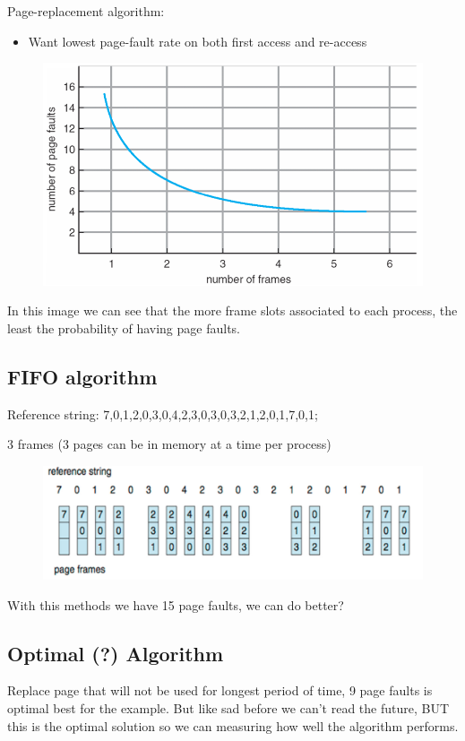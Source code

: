 Page-replacement algorithm: 

\begin{itemize}
    \item[] Want lowest page-fault rate on both first access and re-access
\end{itemize}
\newpage
\begin{figure}[htbp]
    \centering
    \includegraphics[width=0.65\linewidth]{img/ahet.png}
\end{figure}

In this image we can see that the more frame slots associated to each process, the least the
probability of having page faults.

\subsection{FIFO algorithm}

Reference string: 7,0,1,2,0,3,0,4,2,3,0,3,0,3,2,1,2,0,1,7,0,1; 

3 frames (3 pages can be in memory at a time per process)


\begin{figure}[htbp]
    \centering
    \includegraphics[width=0.75\linewidth]{img/dgnf.png}
\end{figure}

With this methods we have 15 page faults, we can do better?

\subsection{Optimal (?) Algorithm}

Replace page that will not be used for longest period of time, 9 page faults is optimal best for the example. But like sad before we can't read the future, BUT this is the optimal solution so we can measuring how well the algorithm performs. 

